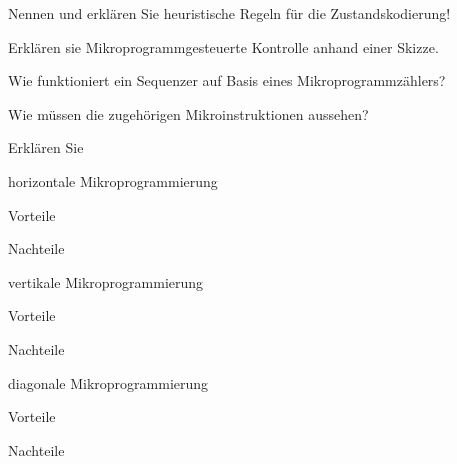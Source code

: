 \documentclass
[
  draft    = true,
  fontsize = 11pt,
  parskip  = half-,
  BCOR     = 0pt,
  DIV      = 11,
  ngerman,
  dvipsnames
]
{scrartcl}
\begin{document}
\begin{mytemize}
\begin{mytemize}
          \item Nennen und erklären Sie heuristische Regeln für die Zustandskodierung!
        \end{mytemize}
  \item Erklären sie Mikroprogrammgesteuerte Kontrolle anhand einer Skizze.
  \item Wie funktioniert ein Sequenzer auf Basis eines Mikroprogrammzählers?
        \begin{mytemize}
          \item Wie müssen die zugehörigen Mikroinstruktionen aussehen?
        \end{mytemize}
  \item Erklären Sie
        \begin{mytemize}
          \item horizontale Mikroprogrammierung
                \begin{mytemize}
                  \item Vorteile
                  \item Nachteile
                \end{mytemize}
          \item vertikale Mikroprogrammierung
                \begin{mytemize}
                  \item Vorteile
                  \item Nachteile
                \end{mytemize}
          \item diagonale Mikroprogrammierung
                \begin{mytemize}
                  \item Vorteile
                  \item Nachteile
                \end{mytemize}
        \end{mytemize}
\end{mytemize}

\end{document}
